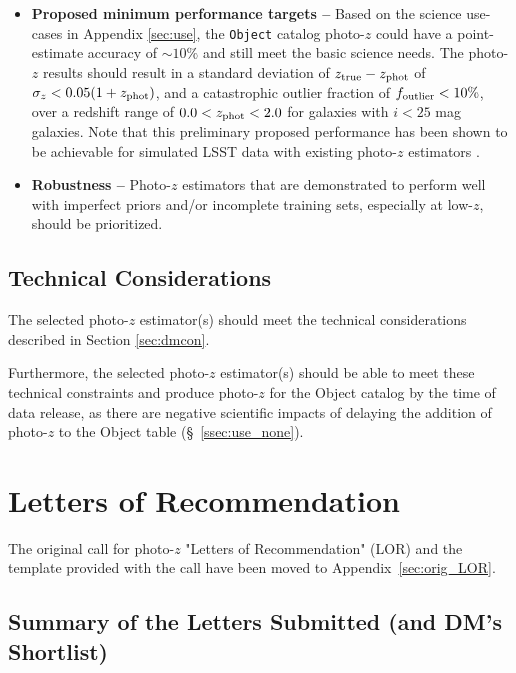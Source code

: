 \documentclass[DM,authoryear,toc]{lsstdoc}
\begin{document}
\begin{itemize}
\item \textbf{Proposed minimum performance targets --} 
Based on the science use-cases in Appendix \ref{sec:use}, the {\tt Object} catalog photo-$z$ could have a point-estimate accuracy of $\sim10\%$ and still meet the basic science needs.
The photo-$z$ results should result in a standard deviation of $z_{\rm true}-z_{\rm phot}$ of $\sigma_z < 0.05(1+z_{\rm phot})$, and a catastrophic outlier fraction of $f_{\rm outlier} < 10\%$, over a redshift range of $0.0 < z_{\rm phot} < 2.0$ for galaxies with $i<25$ mag galaxies.
Note that this preliminary proposed performance has been shown to be achievable for simulated LSST data with existing photo-$z$ estimators \citep[e.g.,][]{2018AJ....155....1G,2020MNRAS.499.1587S}.
\item \textbf{Robustness -- } Photo-$z$ estimators that are demonstrated to perform well with imperfect priors and/or incomplete training sets, especially at low-$z$, should be prioritized.
\end{itemize}

\subsection{Technical Considerations}

The selected photo-$z$ estimator(s) should meet the technical considerations described in Section \ref{sec:dmcon}.

Furthermore, the selected photo-$z$ estimator(s) should be able to meet these technical constraints and produce photo-$z$ for the Object catalog by the time of data release, as there are negative scientific impacts of delaying the addition of photo-$z$ to the Object table (\S~\ref{ssec:use_none}).



\section{Letters of Recommendation} \label{sec:lor}

The original call for photo-$z$ "Letters of Recommendation" (LOR) and the template provided with the call have been moved to Appendix~\ref{sec:orig_LOR}.

\subsection{Summary of the Letters Submitted (and DM's Shortlist)} \label{ssec:lor_choice}
\end{document}
